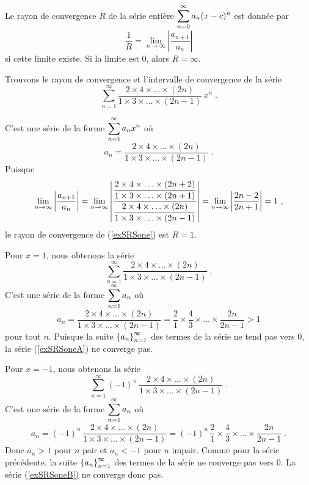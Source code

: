 {\begin{theorem} \label{RadiusConvComp}
Le rayon de convergence $R$ de la série entière
$\displaystyle \sum_{n=0}^\infty a_n (x-c)^n$ est donnée par
\[
\frac{1}{R} = \lim_{n\rightarrow \infty} \left|\frac{a_{n+1}}{a_n}\right|
\]
si cette limite existe.  Si la limite est $0$, alors $R=\infty$.
\end{theorem}

\begin{egg}
Trouvons le rayon de convergence et l'intervalle de convergence de la série
\begin{equation}\label{exSRSone}
\sum_{n=1}^\infty \frac{2\times 4 \times \ldots \times (2n)}
{1 \times 3 \times \ldots \times (2n-1)} \, x^n \; .
\end{equation}

C'est une série de la forme $\displaystyle \sum_{n=1}^\infty a_n x^n$ où
\[
a_n = \frac{2 \times 4 \times \ldots \times (2n)}
{1 \times 3 \times \ldots \times (2n-1)} \; .
\]
Puisque
\[
\lim_{n\rightarrow \infty} \left| \frac{a_{n+1}}{a_n}\right|
= \lim_{n\rightarrow \infty} \left|
\frac{\DS \frac{2 \times 4 \times \ldots \times (2n+2)}
{\DS 1 \times 3 \times \ldots \times (2n+1)}}
{\DS \frac{2 \times 4 \times \ldots \times (2n)}
{\DS 1 \times 3 \times \ldots \times (2n-1)}} \right|
= \lim_{n\rightarrow \infty} \left| \frac{2n-2}{2n+1} \right| = 1 \ ,
\]
le rayon de convergence de (\ref{exSRSone}) est $R=1$.

Pour $x=1$, nous obtenons la série
\begin{equation}\label{exSRSoneA}
\sum_{n=1}^\infty \frac{2\times 4 \times \ldots \times (2n)}
{1 \times 3 \times \ldots \times (2n-1)} \; .
\end{equation}
C'est une série de la forme $\displaystyle \sum_{n=1}^\infty a_n$ où
\[
a_n = \frac{2\times 4 \times \ldots \times (2n)}
{1 \times 3 \times \ldots \times (2n-1)}
 = \frac{2}{1}\times \frac{4}{3} \times \ldots \times \frac{2n}{2n-1}
>1
\]
pour tout $n$.  Puisque la suite
$\displaystyle \left\{ a_n \right\}_{n=1}^\infty$ des termes de la
série ne tend pas vers $0$, la série (\ref{exSRSoneA}) ne converge
pas.

Pour $x=-1$, nous obtenons la série
\begin{equation}\label{exSRSoneB}
\sum_{n=1}^\infty (-1)^n \,\frac{2\times 4 \times \ldots \times (2n)}
{1 \times 3 \times \ldots \times (2n-1)} \; .
\end{equation}
C'est une série de la forme
$\displaystyle \sum_{n=1}^\infty a_n$ où
\[
a_n = (-1)^n \, \frac{2\times 4 \times \ldots \times (2n)}
{1 \times 3 \times \ldots \times (2n-1)}
 = (-1)^n \,\frac{2}{1}\times \frac{4}{3} \times \ldots \times
\frac{2n}{2n-1} \; .
\]
Donc $a_n > 1$ pour $n$ pair et $a_n<-1$ pour $n$ impair.  Comme pour la
série précédente, la suite
$\displaystyle \left\{ a_n \right\}_{n=1}^\infty$ des termes de la
série ne converge pas vers $0$.  La série (\ref{exSRSoneB}) ne
converge donc pas.


\end{egg}}
